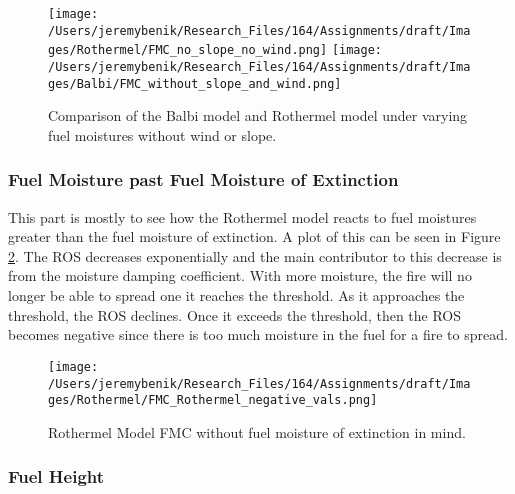 \documentclass{article}
\begin{document}
\begin{figure}[!h]
\centering
  \texttt{[image: /Users/jeremybenik/Research\_Files/164/Assignments/draft/Images/Rothermel/FMC\_no\_slope\_no\_wind.png]}
  \texttt{[image: /Users/jeremybenik/Research\_Files/164/Assignments/draft/Images/Balbi/FMC\_without\_slope\_and\_wind.png]}
  \caption{Comparison of the Balbi model and Rothermel model under varying fuel moistures without wind or slope.}
  \label{balbi_vs_rother_fmc_no_wind_no_slope}
\end{figure}

\subsubsection*{Fuel Moisture past Fuel Moisture of Extinction}
\indent This part is mostly to see how the Rothermel model reacts to fuel moistures greater than the fuel moisture of extinction. A plot of this can be seen in Figure \ref{rothermel_neg}. The ROS decreases exponentially and the main contributor to this decrease is from the moisture damping coefficient. With more moisture, the fire will no longer be able to spread one it reaches the threshold. As it approaches the threshold, the ROS declines. Once it exceeds the threshold, then the ROS becomes negative since there is too much moisture in the fuel for a fire to spread.

\begin{figure}[!h]
\centering
  \texttt{[image: /Users/jeremybenik/Research\_Files/164/Assignments/draft/Images/Rothermel/FMC\_Rothermel\_negative\_vals.png]}
  \caption{Rothermel Model FMC without fuel moisture of extinction in mind.}
  \label{rothermel_neg}
\end{figure}

\subsubsection{Fuel Height}
\end{document}
